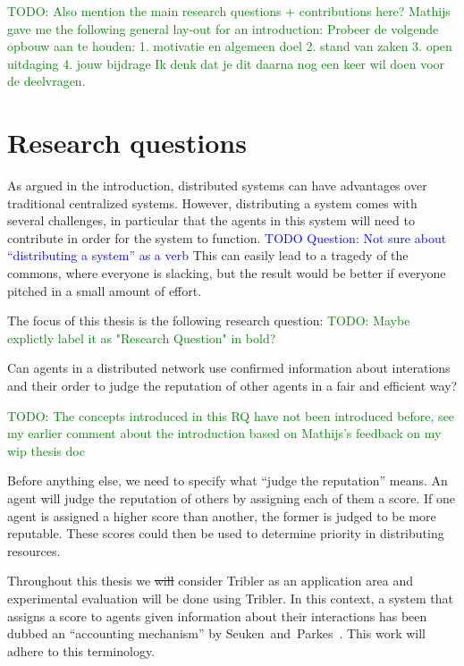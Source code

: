 \documentclass[a4paper,11pt]{book}
\newcommand\suggestion[1]{\textcolor{green}{TODO: #1}}
\newcommand\question[1]{\textcolor{blue}{TODO Question: #1}}
\theoremstyle{definition}
\begin{document}
\suggestion{Also mention the main research questions + contributions here? Mathijs gave me the following general lay-out
for an introduction: Probeer de volgende opbouw aan te houden:  1. motivatie en algemeen doel 2. stand van zaken 3. open
uitdaging 4. jouw bijdrage Ik denk dat je dit daarna nog een keer wil doen voor de deelvragen.}


\chapter{Research questions}

As argued in the introduction, distributed systems can have advantages over traditional centralized
systems. However, distributing a system comes with several challenges, in particular that
the agents in this system will need to contribute in order for the system to
function. \question{Not sure about ``distributing a system'' as a verb} This can easily lead to a tragedy of the commons, where everyone is slacking,
but the result would be better if everyone pitched in a small amount of effort.

The focus of this thesis is the following research question:
\suggestion{Maybe explictly label it as "Research Question" in bold?}
\begin{center}
    Can agents in a distributed network use confirmed information about
    interations and their order to judge the reputation of other agents
    in a fair and efficient way?
\end{center}

\suggestion{The concepts introduced in this RQ have not been introduced before, see my earlier comment about the
introduction based on Mathijs's feedback on my wip thesis doc}

Before anything else, we need to specify what ``judge the reputation'' means.
An agent will judge the reputation of others by assigning each of them a score.
If one agent is assigned a higher score than another, the former is judged to be more
reputable.  These scores could then be used to determine priority in distributing resources.

Throughout this thesis we \sout{will} consider Tribler as an application area and experimental
evaluation will be done using Tribler. 
In this context, a system that assigns a score
to agents given information about their interactions has been dubbed an 
``accounting mechanism'' by Seuken~and~Parkes~\cite{seuken2010accounting}. This
work will adhere to this terminology.
\end{document}
